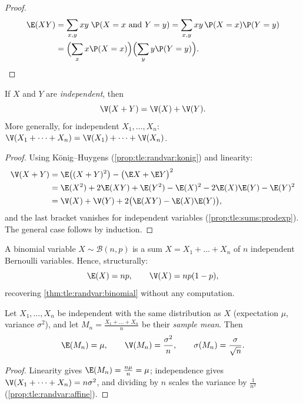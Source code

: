 \begin{proof}
\[
\begin{aligned}
\E(XY) &= \sum_{x, y} xy\;\P(X = x \text{ and } Y = y)
= \sum_{x, y} xy\,\P(X=x)\P(Y=y) \\
&= \Bigl(\sum_x x\P(X=x)\Bigr)\Bigl(\sum_y y\P(Y=y)\Bigr). \qedhere
\end{aligned}
\]
\end{proof}

\begin{theorem}\label{thm:tle:sums:variance}
If $X$ and $Y$ are \emph{independent}, then
\[
\V(X + Y) = \V(X) + \V(Y).
\]
More generally, for independent $X_1, \dots, X_n$:
$\V(X_1 + \dots + X_n) = \V(X_1) + \dots + \V(X_n)$.
\end{theorem}

\begin{proof}
Using König--Huygens (\cref{prop:tle:randvar:konig}) and linearity:
\begin{align*}
\V(X + Y) &= \E\bigl((X+Y)^2\bigr) - \bigl(\E X + \E Y\bigr)^2\\
&= \E(X^2) + 2\E(XY) + \E(Y^2)
- \E(X)^2 - 2\E(X)\E(Y) - \E(Y)^2\\
&= \V(X) + \V(Y) + 2\bigl(\E(XY) - \E(X)\E(Y)\bigr),
\end{align*}
and the last bracket vanishes for independent variables
(\cref{prop:tle:sums:prodexp}). The general case follows by induction.
\end{proof}

\begin{example}\label{ex:tle:sums:binomial}
A binomial variable $X \sim \mathcal B(n, p)$ is a sum
$X = X_1 + \dots + X_n$ of $n$ independent Bernoulli variables. Hence,
structurally:
\[
\E(X) = np, \qquad \V(X) = np(1-p),
\]
recovering \cref{thm:tle:randvar:binomial} without any computation.
\end{example}

\begin{proposition}\label{prop:tle:sums:mean}
Let $X_1, \dots, X_n$ be independent with the same distribution as $X$
(expectation $\mu$, variance $\sigma^2$), and let
$M_n = \frac{X_1 + \dots + X_n}{n}$ be their \emph{sample
mean}. Then
\[
\E(M_n) = \mu, \qquad \V(M_n) = \frac{\sigma^2}{n}, \qquad
\sigma(M_n) = \frac{\sigma}{\sqrt n}.
\]
\end{proposition}

\begin{proof}
Linearity gives $\E(M_n) = \frac{n\mu}{n} = \mu$; independence gives
$\V(X_1 + \dots + X_n) = n\sigma^2$, and dividing by $n$ scales the
variance by $\frac{1}{n^2}$ (\cref{prop:tle:randvar:affine}).
\end{proof}


